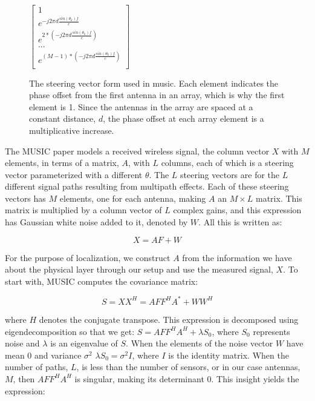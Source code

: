 \documentclass[12pt]{report}
\begin{document}
\begin{figure}[!htb]
    \begin{center}
        \caption{The steering vector form used in music. Each element indicates the phase offset from the first antenna in an array, which is why the first element is 1. Since the antennas in the array are spaced at a constant distance, $d$, the phase offset at each array element is a multiplicative increase.}
        \label{figure: music-steering-vector}
        $\begin{bmatrix}
        1 \\
        e^{-j 2 \pi d \frac{sin(\theta_{k}) f}{c}} \\
        e^{2 * (-j 2 \pi d \frac{sin(\theta_{k}) f}{c})} \\
        ... \\
        e^{(M - 1) * (-j 2 \pi d \frac{sin(\theta_{k}) f}{c})} \\
        \end{bmatrix}$
    \end{center}
\end{figure}

The MUSIC paper models a received wireless signal, the column vector $X$ with $M$ elements, in terms of a matrix, $A$, with $L$ columns, each of which is a steering vector parameterized with a different $\theta$. The $L$ steering vectors are for the $L$ different signal paths resulting from multipath effects. Each of these steering vectors has $M$ elements, one for each antenna, making $A$ an $M \times L$ matrix. This matrix is multiplied by a column vector of $L$ complex gains, and this expression has Gaussian white noise added to it, denoted by $W$. All this is written as:

$$X = AF + W$$

For the purpose of localization, we construct $A$ from the information we have about the physical layer through our setup and use the measured signal, $X$. To start with, MUSIC computes the covariance matrix:

$$S = XX^{H} = A FF^{H} A^{*} + WW^{H}$$

where $H$ denotes the conjugate transpose. This expression is decomposed using eigendecomposition so that we get: $S = A FF^{H} A^{H} + \lambda S_{0}$, where $S_{0}$ represents noise and $\lambda$ is an eigenvalue of $S$. When the elements of the noise vector $W$ have mean 0 and variance $\sigma^{2}$ $\lambda S_{0} = \sigma^{2} I$, where $I$ is the identity matrix. When the number of paths, $L$, is less than the number of sensors, or in our case antennas, $M$, then $A FF^{H} A^{H}$ is singular, making its determinant 0. This insight yields the expression:
\end{document}
